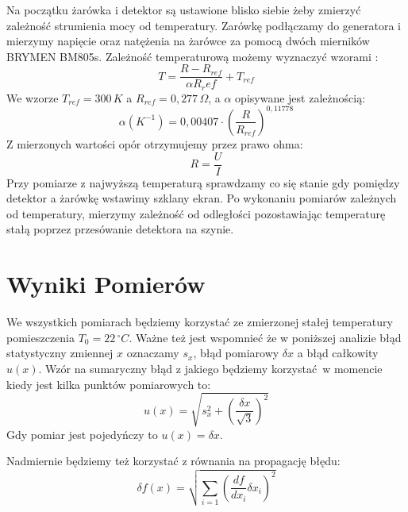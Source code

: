 \documentclass[12pt]{article}
\begin{document}
Na początku żarówka i detektor są ustawione blisko siebie żeby zmierzyć zależność strumienia mocy od temperatury.
Zarówkę podłączamy do generatora i mierzymy napięcie oraz natężenia na żarówce za pomocą dwóch mierników BRYMEN BM805s. Zależność temperaturową możemy wyznaczyć wzorami \cite{skrypt}:
\begin{equation}
    T = \frac{R - R_{ref}}{\alpha R_ref} + T_{ref}
    \label{eq:temp_bulb}
\end{equation}
We wzorze $T_{ref} = 300\,K$ a $R_{ref} = 0{,}277\, \Omega$, a $\alpha$ opisywane jest zależnością:
\[
    \alpha(K^{-1}) = 0{,}00407 \cdot (\frac{R}{R_{ref}})^{0{,}11778}
\]
Z mierzonych wartości opór otrzymujemy przez prawo ohma:
\[
    R = \frac{U}{I}
\]
Przy pomiarze z najwyższą temperaturą sprawdzamy co się stanie gdy pomiędzy detektor a żarówkę wstawimy szklany ekran.
Po wykonaniu pomiarów zależnych od temperatury, mierzymy zależność od odległości pozostawiając temperaturę stałą poprzez przesówanie detektora na szynie.
\section{Wyniki Pomierów}
We wszystkich pomiarach będziemy korzystać ze zmierzonej stałej temperatury pomieszczenia $T_0 = 22 \, ^{\circ}C$.
Ważne też jest wspomnieć że w poniższej analizie błąd statystyczny zmiennej $x$ oznaczamy $s_x$, błąd pomiarowy $\delta x$ a błąd całkowity $u(x)$.
Wzór na sumaryczny błąd z jakiego będziemy korzystać w momencie kiedy jest kilka punktów pomiarowych to:
\begin{equation}
    u(x) = \sqrt{s_x^2 + (\frac{\delta x}{\sqrt{3}})^2}
    \label{eq:combined_error}
\end{equation}
Gdy pomiar jest pojedyńczy to $u(x) = \delta x$.

Nadmiernie będziemy też korzystać z równania na propagację błędu:
\begin{equation}
    \delta f(x) = \sqrt{\sum_{i=1} (\frac{df}{dx_i} \delta x_i)^2}
    \label{eq:error_propagation}
\end{equation}
\end{document}
